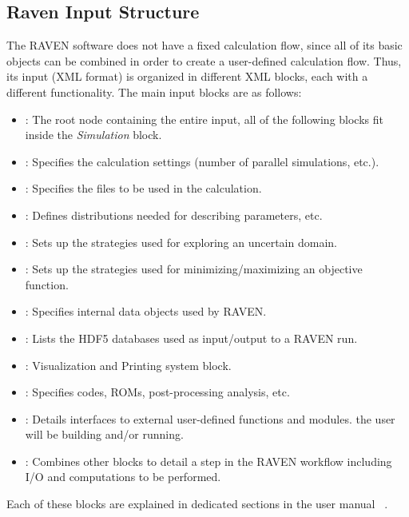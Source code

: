 \subsection{Raven Input Structure}
\label{sub:InputStructure}
The RAVEN software does not have a fixed calculation flow, since all of its basic
objects can be combined in order to create a user-defined calculation flow.
%
Thus, its input (XML format) is organized in different XML blocks, each with a
different functionality.
%
The main input blocks are as follows:
\begin{itemize}
  \item {}: The root node containing the
  entire input, all of
  the following blocks fit inside the \emph{Simulation} block.
  \item {}: Specifies the calculation
  settings (number of parallel simulations, etc.).
  \item {}: Specifies the files to be
  used in the calculation.
  \item {}: Defines distributions
  needed for describing parameters, etc.
  \item {}: Sets up the strategies used for
  exploring an uncertain domain.
  \item {}: Sets up the strategies used for
  minimizing/maximizing an objective function.
  \item {}: Specifies internal data objects
  used by RAVEN.
  \item {}: Lists the HDF5 databases used
  as input/output to a
  RAVEN run.
  \item {}: Visualization and
  Printing system block.
  \item {}: Specifies codes, ROMs,
  post-processing analysis, etc.
  \item {}: Details interfaces to external
  user-defined functions and modules.
  the user will be building and/or running.
  \item {}: Combines other blocks to detail a
  step in the RAVEN workflow including I/O and computations to be performed.
\end{itemize}

Each of these blocks are explained in dedicated sections in the user manual ~\cite{RAVENuserManual}.
%



